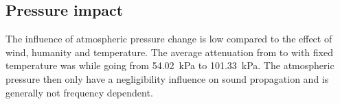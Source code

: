 %
%
%
%
%
%
%


\subsection{Pressure impact}\label{sub:sec:pre_imp}
The influence of atmospheric pressure change is low compared to the effect of wind, humanity and temperature. The average attenuation from  to  with fixed temperature was  while going from \SI{54.02}{\kilo\pascal} to \SI{101.33}{\kilo\pascal}. The atmospheric pressure then only have a negligibility influence on sound propagation and is generally not frequency dependent. 

